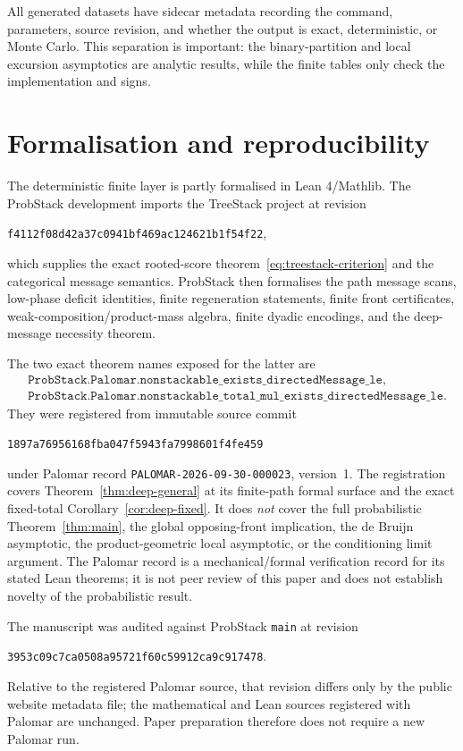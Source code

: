 \documentclass[11pt]{article}
\begin{document}
All generated datasets have sidecar metadata recording the command,
parameters, source revision, and whether the output is exact, deterministic,
or Monte Carlo.  This separation is important: the binary-partition and local
excursion asymptotics are analytic results, while the finite tables only check
the implementation and signs.

\section{Formalisation and reproducibility}\label{sec:formal}

The deterministic finite layer is partly formalised in Lean 4/Mathlib.  The
ProbStack development imports the TreeStack project at revision
\begin{center}
\texttt{f4112f08d42a37c0941bf469ac124621b1f54f22},
\end{center}
which supplies the exact rooted-score theorem~\eqref{eq:treestack-criterion}
and the categorical message semantics.  ProbStack then formalises the path
message scans, low-phase deficit identities, finite regeneration statements,
finite front certificates, weak-composition/product-mass algebra, finite
dyadic encodings, and the deep-message necessity theorem.

The two exact theorem names exposed for the latter are
\begin{align*}
 &\texttt{ProbStack.Palomar.nonstackable\_exists\_directedMessage\_le},\\
 &\texttt{ProbStack.Palomar.nonstackable\_total\_mul\_exists\_directedMessage\_le}.
\end{align*}
They were registered from immutable source commit
\begin{center}
\texttt{1897a76956168fba047f5943fa7998601f4fe459}
\end{center}
under Palomar record
\texttt{PALOMAR-2026-09-30-000023}, version~1.  The registration covers
Theorem~\ref{thm:deep-general} at its finite-path formal surface and the exact
fixed-total Corollary~\ref{cor:deep-fixed}.  It does \emph{not} cover the full
probabilistic Theorem~\ref{thm:main}, the global opposing-front implication,
the de Bruijn asymptotic, the product-geometric local asymptotic, or the
conditioning limit argument.  The Palomar record is a mechanical/formal
verification record for its stated Lean theorems; it is not peer review of this
paper and does not establish novelty of the probabilistic result.

The manuscript was audited against ProbStack \texttt{main} at revision
\begin{center}
\texttt{3953c09c7ca0508a95721f60c59912ca9c917478}.
\end{center}
Relative to the registered Palomar source, that revision differs only by the
public website metadata file; the mathematical and Lean sources registered
with Palomar are unchanged.  Paper preparation therefore does not require a
new Palomar run.
\end{document}
